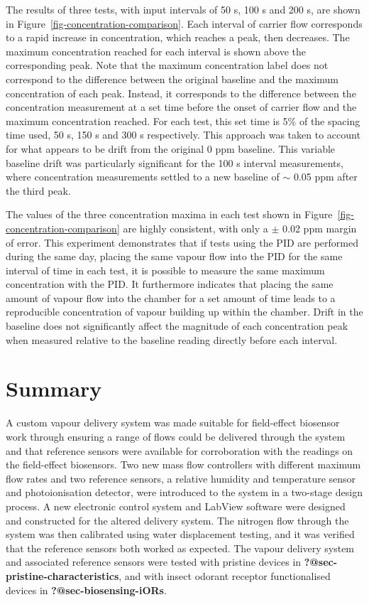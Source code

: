 \documentclass[
  a4paper,
]{scrbook}
\begin{document}
The results of three tests, with input intervals of 50 s, 100 s and 200
s, are shown in Figure~\ref{fig-concentration-comparison}. Each interval
of carrier flow corresponds to a rapid increase in concentration, which
reaches a peak, then decreases. The maximum concentration reached for
each interval is shown above the corresponding peak. Note that the
maximum concentration label does not correspond to the difference
between the original baseline and the maximum concentration of each
peak. Instead, it corresponds to the difference between the
concentration measurement at a set time before the onset of carrier flow
and the maximum concentration reached. For each test, this set time is
5\% of the spacing time used, 50 s, 150 s and 300 s respectively. This
approach was taken to account for what appears to be drift from the
original 0 ppm baseline. This variable baseline drift was particularly
significant for the 100 s interval measurements, where concentration
measurements settled to a new baseline of \(\sim\) 0.05 ppm after the
third peak.

The values of the three concentration maxima in each test shown in
Figure~\ref{fig-concentration-comparison} are highly consistent, with
only a \(\pm\) 0.02 ppm margin of error. This experiment demonstrates
that if tests using the PID are performed during the same day, placing
the same vapour flow into the PID for the same interval of time in each
test, it is possible to measure the same maximum concentration with the
PID. It furthermore indicates that placing the same amount of vapour
flow into the chamber for a set amount of time leads to a reproducible
concentration of vapour building up within the chamber. Drift in the
baseline does not significantly affect the magnitude of each
concentration peak when measured relative to the baseline reading
directly before each interval.

\hypertarget{summary}{%
\section{Summary}\label{summary}}

A custom vapour delivery system was made suitable for field-effect
biosensor work through ensuring a range of flows could be delivered
through the system and that reference sensors were available for
corroboration with the readings on the field-effect biosensors. Two new
mass flow controllers with different maximum flow rates and two
reference sensors, a relative humidity and temperature sensor and
photoionisation detector, were introduced to the system in a two-stage
design process. A new electronic control system and LabView software
were designed and constructed for the altered delivery system. The
nitrogen flow through the system was then calibrated using water
displacement testing, and it was verified that the reference sensors
both worked as expected. The vapour delivery system and associated
reference sensors were tested with pristine devices in
\textbf{?@sec-pristine-characteristics}, and with insect odorant
receptor functionalised devices in \textbf{?@sec-biosensing-iORs}.
\end{document}
